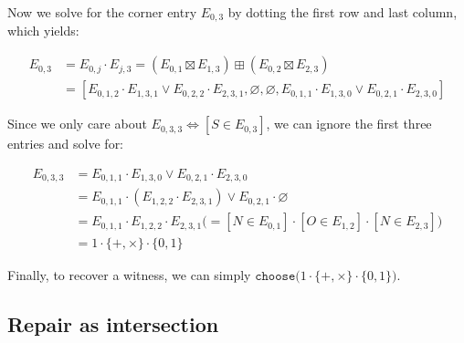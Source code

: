 \documentclass[sigplan,review,acmsmall,nonacm,screen,anonymous]{acmart}\settopmatter{printfolios=false,printccs=false,printacmref=false}
\begin{document}
\noindent Now we solve for the corner entry $E_{0, 3}$ by dotting the first row and last column, which yields:\vspace{-8pt}

\begin{align*}
  E_{0, 3} &= E_{0, j} \cdot E_{j, 3} = (E_{0, 1} \boxtimes E_{1, 3}) \boxplus (E_{0, 2} \boxtimes E_{2, 3})\\
  &= [E_{0, 1, 2} \cdot E_{1, 3, 1} \lor E_{0, 2, 2} \cdot E_{2, 3, 1}, \varnothing, \varnothing, E_{0, 1, 1} \cdot E_{1, 3, 0} \lor E_{0, 2, 1} \cdot E_{2, 3, 0}]
\end{align*}

\noindent Since we only care about $E_{0, 3, 3} \Leftrightarrow [S \in E_{0, 3}]$, we can ignore the first three entries and solve for:\vspace{-8pt}

\begin{align*}
  E_{0, 3, 3} &= E_{0, 1, 1} \cdot E_{1, 3, 0} \lor E_{0, 2, 1} \cdot E_{2, 3, 0}\\
  &= E_{0, 1, 1} \cdot (E_{1, 2, 2} \cdot E_{2, 3, 1}) \lor E_{0, 2, 1} \cdot \varnothing\\
  &= E_{0, 1, 1} \cdot E_{1, 2, 2} \cdot E_{2, 3, 1} \big(= [N \in E_{0, 1}] \cdot [O \in E_{1, 2}] \cdot [N \in E_{2, 3}]\big)\\
  &= 1 \cdot \{+, \times\} \cdot \{0, 1\}
\end{align*}

\noindent Finally, to recover a witness, we can simply $\texttt{choose}\big(1 \cdot \{+, \times\} \cdot \{0, 1\}\big)$.


\subsection{Repair as intersection}\label{sec:repair_ex}
\end{document}
